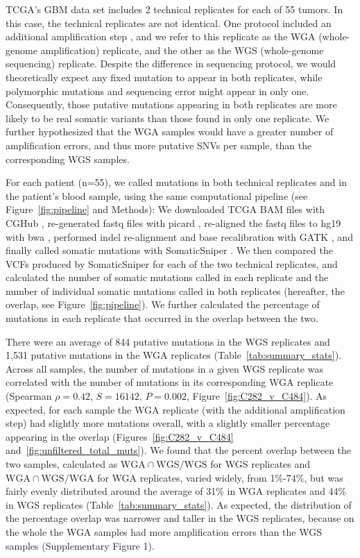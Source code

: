 \documentclass[11 pt]{article} %
\begin{document}
TCGA's GBM data set includes 2 technical replicates for each of 55 tumors. In this case, the technical replicates are not identical. One protocol included an additional amplification step \citep{TCGA-GBM}, and we refer to this replicate as the WGA (whole-genome amplification) replicate, and the other as the WGS (whole-genome sequencing) replicate. Despite the difference in sequencing protocol, we would theoretically expect any fixed mutation to appear in both replicates, while polymorphic mutations and sequencing error might appear in only one. Consequently, those putative mutations appearing in both replicates are more likely to be real somatic variants than those found in only one replicate. We further hypothesized that the WGA samples would have a greater number of amplification errors, and thus more putative SNVs per sample, than the corresponding WGS samples. 

For each patient (n=55), we called mutations in both technical replicates and in the patient's blood sample, using the same computational pipeline (see Figure~\ref{fig:pipeline} and Methods): We downloaded TCGA BAM files with CGHub \citep{CGHub}, re-generated fastq files with picard \citep{picard}, re-aligned the fastq files to hg19 with bwa \citep{bwa}, performed indel re-alignment and base recalibration with GATK \citep{GATK}, and finally called somatic mutations with SomaticSniper \citep{SomaticSniper}. We then compared the VCFs produced by SomaticSniper for each of the two technical replicates, and calculated the number of somatic mutations called in each replicate and the number of individual somatic mutations called in both replicates (hereafter, the overlap, see Figure~\ref{fig:pipeline}). We further calculated the percentage of mutations in each replicate that occurred in the overlap between the two. 

There were an average of 844 putative mutations in the WGS replicates and 1,531 putative mutations in the WGA replicates (Table~\ref{tab:summary_stats}). Across all samples, the number of mutations in a given WGS replicate was correlated with the number of mutations in its corresponding WGA replicate (Spearman $\rho=0.42$, $S=16142$, $P=0.002$, Figure~\ref{fig:C282_v_C484}). As expected, for each sample the WGA replicate (with the additional amplification step) had slightly more mutations overall, with a slightly smaller percentage appearing in the overlap (Figures~\ref{fig:C282_v_C484} and~\ref{fig:unfiltered_total_muts}). We found that the percent overlap between the two samples, calculated as $\text{WGA} \cap \text{WGS}/\text{WGS}$ for WGS replicates and $\text{WGA} \cap \text{WGS}/\text{WGA}$ for WGA replicates, varied widely, from 1\%-74\%, but was fairly evenly distributed around the average of 31\% in WGA replicates and 44\% in WGS replicates (Table~\ref{tab:summary_stats}). As expected, the distribution of the percentage overlap was narrower and taller in the WGS replicates, because on the whole the WGA samples had more amplification errors than the WGS samples (Supplementary Figure 1).
\end{document}
